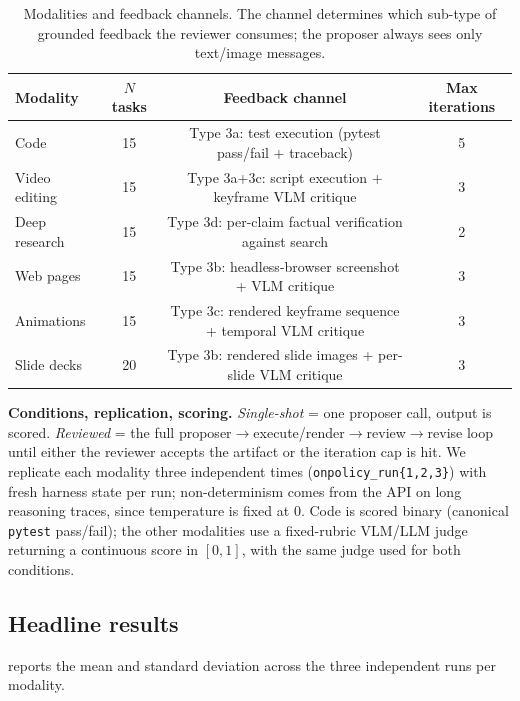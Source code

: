 \begin{table}[ht]
\centering
\caption{Modalities and feedback channels. The channel determines which sub-type of grounded feedback the reviewer consumes; the proposer always sees only text/image messages.}
\label{tab:harness-setup}
\small
\begin{tabular}{lccc}
\toprule
Modality & $N$ tasks & Feedback channel & Max iterations \\
\midrule
Code           & 15 & Type 3a: test execution (pytest pass/fail + traceback)           & 5 \\
Video editing  & 15 & Type 3a+3c: script execution + keyframe VLM critique             & 3 \\
Deep research  & 15 & Type 3d: per-claim factual verification against search           & 2 \\
Web pages      & 15 & Type 3b: headless-browser screenshot + VLM critique              & 3 \\
Animations     & 15 & Type 3c: rendered keyframe sequence + temporal VLM critique      & 3 \\
Slide decks    & 20 & Type 3b: rendered slide images + per-slide VLM critique          & 3 \\
\bottomrule
\end{tabular}
\end{table}

\textbf{Conditions, replication, scoring.}
\emph{Single-shot} = one proposer call, output is scored. \emph{Reviewed} = the full proposer$\to$execute/render$\to$review$\to$revise loop until either the reviewer accepts the artifact or the iteration cap is hit. We replicate each modality three independent times (\texttt{onpolicy\_run\{1,2,3\}}) with fresh harness state per run; non-determinism comes from the API on long reasoning traces, since temperature is fixed at $0$. Code is scored binary (canonical \texttt{pytest} pass/fail); the other modalities use a fixed-rubric VLM/LLM judge returning a continuous score in $[0, 1]$, with the same judge used for both conditions.

\subsection{Headline results}
\label{sec:harness-headline}

 reports the mean and standard deviation across the three independent runs per modality.

